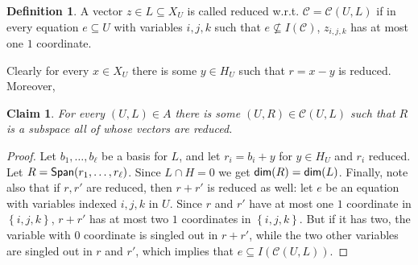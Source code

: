 \documentclass[11pt]{article}
\numberwithin{equation}{section}
\newtheorem{claim}[theorem]{Claim}
\theoremstyle{definition}
\newtheorem{definition}[theorem]{Definition}
\theoremstyle{plain}
\newcommand{\C}{\mathbb C}
\newcommand\set[1]{{\left\{ #1 \right\}}}
\newcommand\spn{{\sf Span}}
\newcommand*\dimm{{\sf dim}}
\renewcommand\dim{\dimm}
\renewcommand\subset{\subseteq}
\def\C{\mathcal{C}}
\begin{document}
\begin{definition}
  A vector $z\in L\subset X_U$ is called reduced w.r.t. $\C=\C(U,L)$
  if in every equation $e\subset U$ with variables $i,j,k$ such that $e\not\subset I(\C)$,
  $z_{i,j,k}$ has at most one $1$ coordinate.
\end{definition}
Clearly for every $x\in X_U$ there is some $y\in H_U$ such that $r=x-y$ is reduced. Moreover,
\begin{claim} For every $(U,L)\in A$ there is some $(U,R)\in \C(U,L)$ such that $R$ is a subspace all of whose vectors are reduced.
\end{claim}
\begin{proof}
Let $b_1,\ldots,b_\ell$ be a basis for $L$, and let $r_i = b_i + y$
for $y\in H_U$ and $r_i$ reduced. Let $R=
\spn(r_1,\ldots,r_\ell)$. Since $L\cap H = 0$ we get $\dimm( R) = \dim
(L)$. Finally, note also that if $r,r'$ are reduced, then $r+r'$ is
reduced as well: let $e$ be an equation with variables indexed $i,j,k$
in $U$. Since $r$ and $r'$ have at most one $1$ coordinate in
$\set{i,j,k}$, $r+r'$ has at most two $1$ coordinates in
$\set{i,j,k}$. But if  it has two, the variable with $0$ coordinate is
singled out in  $r+r'$, while the two other variables are singled out
in $r$ and $r'$, which implies that $e\subseteq I(\C(U,L))$.
\end{proof}
\end{document}

